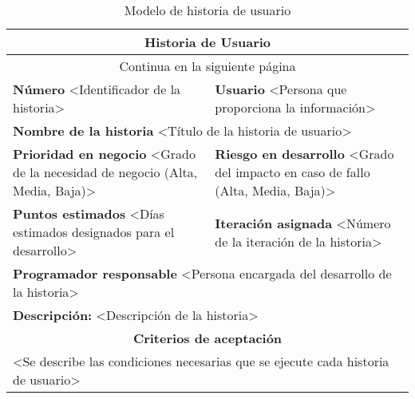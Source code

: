 \begin{longtable}{|p{6.7cm}|p{6.7cm}|}
    \caption{Modelo de historia de usuario} \label{tab:modelo-historia-de-usuario}
    \\
    \hline
    \multicolumn{2}{|c|}{\textbf{Historia de Usuario}}                                                                                                                             \\
    \hline

    \endfirsthead

    \hline
    \endhead

    \hline
    \multicolumn{2}{|c|}{{Continua en la siguiente página}}                                                                                                                        \\
    \hline
    \endfoot

    \hline
    \endlastfoot

    \textbf{Número} <Identificador de la historia>                                        & \textbf{Usuario} <Persona que proporciona la información>                              \\
    \hline
    \multicolumn{2}{|l|}{\textbf{Nombre de la historia} <Título de la historia de usuario> }                                                                                       \\
    \hline
    \textbf{Prioridad en negocio}  <Grado de la necesidad de negocio (Alta, Media, Baja)> & \textbf{Riesgo en desarrollo} <Grado del impacto en caso de fallo (Alta, Media, Baja)> \\
    \hline
    \textbf{Puntos estimados} <Días estimados designados para el desarrollo>              & \textbf{Iteración asignada} <Número de la iteración de la historia>                    \\
    \hline
    \multicolumn{2}{|l|}{\textbf{Programador responsable} <Persona encargada del desarrollo de la historia> }                                                                      \\
    \hline
    \multicolumn{2}{|p{13.4cm}|}{\textbf{Descripción:} <Descripción de la historia>    }                                                                                           \\
    \hline
    \multicolumn{2}{|c|}{\textbf{Criterios de aceptación}}                                                                                                                         \\
    \hline
    \multicolumn{2}{|p{13.4cm}|}{<Se describe las condiciones necesarias que se ejecute cada historia de usuario>}                                                                 \\
    \hline
\end{longtable}

